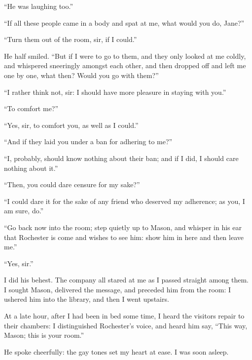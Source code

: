 \enquote{He was laughing too.}

\enquote{If all these people came in a body and spat at me, what would
you do, Jane?}

\enquote{Turn them out of the room, sir, if I could.}

He half smiled. \enquote{But if I were to go to them, and they only
looked at me coldly, and whispered sneeringly amongst each other, and
then dropped off and left me one by one, what then? Would you go with
them?}

\enquote{I rather think not, sir: I should have more pleasure in staying
with you.}

\enquote{To comfort me?}

\enquote{Yes, sir, to comfort you, as well as I could.}

\enquote{And if they laid you under a ban for adhering to me?}

\enquote{I, probably, should know nothing about their ban; and if I did,
I should care nothing about it.}

\enquote{Then, you could dare censure for my sake?}

\enquote{I could dare it for the sake of any friend who deserved my
adherence; as you, I am sure, do.}

\enquote{Go back now into the room; step quietly up to Mason, and
whisper in his ear that \Mr{} Rochester is come and wishes to see him:
show him in here and then leave me.}

\enquote{Yes, sir.}

I did his behest. The company all stared at me as I passed straight
among them. I sought \Mr{} Mason, delivered the message, and preceded him
from the room: I ushered him into the library, and then I went upstairs.

At a late hour, after I had been in bed some time, I heard the visitors
repair to their chambers: I distinguished \Mr{} Rochester's voice, and
heard him say, \enquote{This way, Mason; this is your room.}

He spoke cheerfully: the gay tones set my heart at ease. I was soon
asleep.
